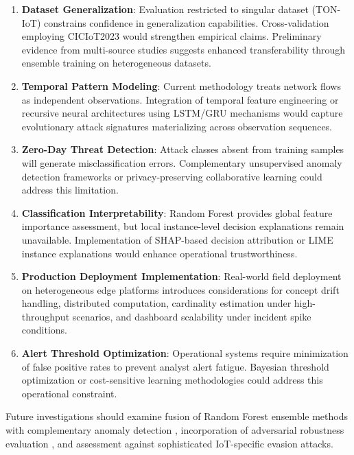 \documentclass[conference]{IEEEtran}
\begin{document}
\begin{enumerate}
\item \textbf{Dataset Generalization}: Evaluation restricted to singular dataset (TON-IoT) constrains confidence in generalization capabilities. Cross-validation employing CICIoT2023 \cite{b8} would strengthen empirical claims. Preliminary evidence from multi-source studies \cite{b15} suggests enhanced transferability through ensemble training on heterogeneous datasets.

\item \textbf{Temporal Pattern Modeling}: Current methodology treats network flows as independent observations. Integration of temporal feature engineering or recursive neural architectures using LSTM/GRU mechanisms \cite{b5, b11} would capture evolutionary attack signatures materializing across observation sequences.

\item \textbf{Zero-Day Threat Detection}: Attack classes absent from training samples will generate misclassification errors. Complementary unsupervised anomaly detection frameworks \cite{b13} or privacy-preserving collaborative learning \cite{b18} could address this limitation.

\item \textbf{Classification Interpretability}: Random Forest provides global feature importance assessment, but local instance-level decision explanations remain unavailable. Implementation of SHAP-based decision attribution \cite{b1} or LIME instance explanations would enhance operational trustworthiness.

\item \textbf{Production Deployment Implementation}: Real-world field deployment on heterogeneous edge platforms \cite{b14, b2} introduces considerations for concept drift handling, distributed computation, cardinality estimation under high-throughput scenarios, and dashboard scalability under incident spike conditions.

\item \textbf{Alert Threshold Optimization}: Operational systems require minimization of false positive rates to prevent analyst alert fatigue. Bayesian threshold optimization or cost-sensitive learning methodologies could address this operational constraint.
\end{enumerate}

Future investigations should examine fusion of Random Forest ensemble methods with complementary anomaly detection \cite{b13}, incorporation of adversarial robustness evaluation \cite{b4}, and assessment against sophisticated IoT-specific evasion attacks.
\end{document}
